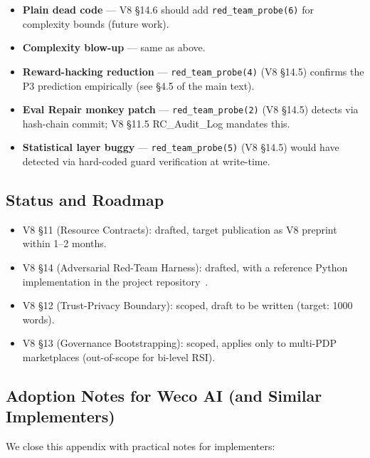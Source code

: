 \documentclass{article}
\theoremstyle{definition}
\begin{document}
\begin{itemize}
    \item \textbf{Plain dead code} --- V8 \S14.6 should add \texttt{red\_team\_probe(6)} for complexity bounds (future work).
    \item \textbf{Complexity blow-up} --- same as above.
    \item \textbf{Reward-hacking reduction} --- \texttt{red\_team\_probe(4)} (V8 \S14.5) confirms the P3 prediction empirically (see \S4.5 of the main text).
    \item \textbf{Eval Repair monkey patch} --- \texttt{red\_team\_probe(2)} (V8 \S14.5) detects via hash-chain commit; V8 \S11.5 RC\_Audit\_Log mandates this.
    \item \textbf{Statistical layer buggy} --- \texttt{red\_team\_probe(5)} (V8 \S14.5) would have detected via hard-coded guard verification at write-time.
\end{itemize}

\subsection{Status and Roadmap}

\begin{itemize}
    \item V8 \S11 (Resource Contracts): drafted, target publication as V8 preprint within 1--2 months.
    \item V8 \S14 (Adversarial Red-Team Harness): drafted, with a reference Python implementation in the project repository~\cite{anon2026bi}.
    \item V8 \S12 (Trust-Privacy Boundary): scoped, draft to be written (target: 1000 words).
    \item V8 \S13 (Governance Bootstrapping): scoped, applies only to multi-PDP marketplaces (out-of-scope for bi-level RSI).
\end{itemize}

\subsection{Adoption Notes for Weco AI (and Similar Implementers)}

We close this appendix with practical notes for implementers:
\end{document}
